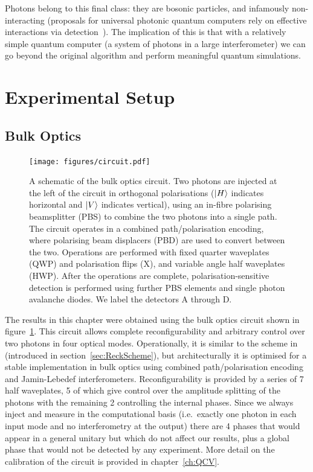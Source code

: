 Photons belong to this final class: they are bosonic particles, and infamously
non-interacting (proposals for universal photonic quantum computers rely on
effective interactions via detection~\cite{klm}). The implication of this is
that with a relatively simple quantum computer (a system of photons in a large
interferometer) we can go beyond the original \bosonsampling{} algorithm and
perform meaningful quantum simulations.

\section{Experimental Setup}
\subsection{Bulk Optics}
\label{sec:BulkReck}
\begin{figure}[t]
  \centering
  \texttt{[image: figures/circuit.pdf]}
  \caption[A schematic of the bulk optics circuit used for simulations.]
  {A schematic of the bulk optics circuit. Two photons are injected at
  the left of the circuit in orthogonal polarisations (\(\left|H\right\rangle\) indicates
  horizontal and \(\left|V\right\rangle\) indicates vertical), using an in-fibre polarising
  beamsplitter (PBS) to combine the two photons into a single path. The circuit
  operates in a combined path/polarisation encoding, where polarising beam
  displacers (PBD) are used to convert between the two. Operations are performed
  with fixed quarter waveplates (QWP) and polarisation flips (X), and variable
  angle half waveplates (HWP). After the operations are complete,
  polarisation-sensitive detection is performed using further PBS elements and
  single photon avalanche diodes. We label the detectors A through D.}
  \label{fig:circuit}
\end{figure}
The results in this chapter were obtained using the bulk optics circuit shown in
figure~\ref{fig:circuit}. This circuit allows complete reconfigurability and
arbitrary control over two photons in four optical modes. Operationally, it is
similar to the scheme in~\cite{reck} (introduced in
section~\ref{sec:ReckScheme}), but architecturally it is optimised for a stable
implementation in bulk optics using combined path/polarisation encoding and 
Jamin-Lebedef interferometers. Reconfigurability is provided by a series of 7
half waveplates, 5 of which give control over the amplitude splitting of the
photons with the remaining 2 controlling the internal phases. Since we always
inject and measure in the computational basis (i.e.\ exactly one photon in each
input mode and no interferometry at the output) there are 4 phases that would
appear in a general unitary but which do not affect our results, plus a global
phase that would not be detected by any experiment. More detail on the
calibration of the circuit is provided in chapter~\ref{ch:QCV}.

